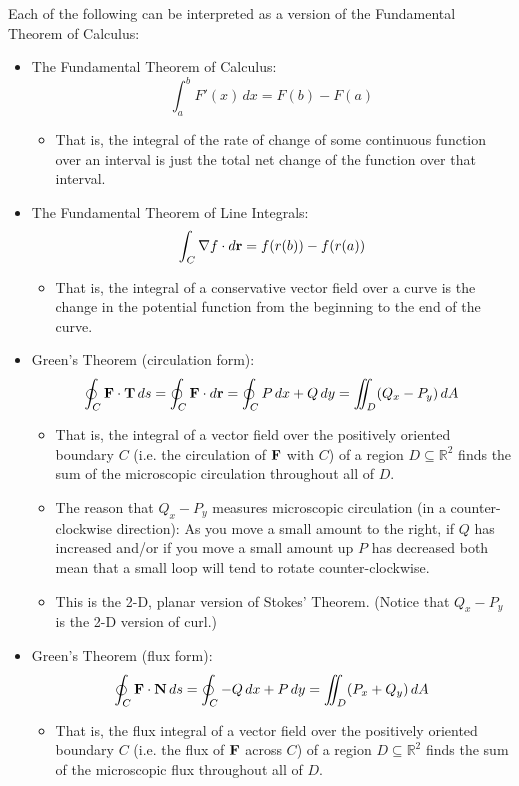Each of the following can be interpreted as a version of the Fundamental Theorem of Calculus:
\begin{itemize}
    \item The Fundamental Theorem of Calculus:
    \[
        \int_a^b F'(x) \, dx = F(b) - F(a)
    \]
    \begin{itemize}
        \item That is, the integral of the rate of change of some continuous function over an interval is just the total net change of the function over that interval.
    \end{itemize}
    \item The Fundamental Theorem of Line Integrals:
    \[
        \int_C \nabla f \cdot d\mathbf{r} = f(r(b)) - f(r(a))
    \]
    \begin{itemize}
        \item That is, the integral of a conservative vector field over a curve is the change in the potential function from the beginning to the end of the curve.
    \end{itemize}
    \item Green’s Theorem (circulation form): 
    \[
        \oint_C \mathbf{F} \cdot \mathbf{T} \, ds = \oint_C \mathbf{F} \cdot d\mathbf{r} = \oint_C P \, dx + Q \, dy = \iint_D (Q_x - P_y) \, dA
    \]
    \begin{itemize}
        \item That is, the integral of a vector field over the positively oriented boundary \(C\) (i.e. the circulation of \(\mathbf{F}\) with \(C\)) of a region \(D \subseteq \mathbb{R}^2\) finds the sum of the microscopic circulation throughout all of \(D\).
        \item The reason that \(Q_x - P_y\) measures microscopic circulation (in a counter-clockwise direction): As you move a small amount to the right, if \(Q\) has increased and/or if you move a small amount up \(P\) has decreased both mean that a small loop will tend to rotate counter-clockwise.
        \item This is the 2-D, planar version of Stokes’ Theorem. (Notice that \(Q_x - P_y\) is the 2-D version of curl.)
    \end{itemize}
    \item Green’s Theorem (flux form):
    \[
        \oint_C \mathbf{F} \cdot \mathbf{N} \, ds = \oint_C -Q \, dx + P \, dy = \iint_D (P_x + Q_y) \, dA
    \]
    \begin{itemize}
        \item That is, the flux integral of a vector field over the positively oriented boundary \(C\) (i.e. the flux of \(\mathbf{F}\) across \(C\)) of a region \(D \subseteq \mathbb{R}^2\) finds the sum of the microscopic flux throughout all of \(D\).

\end{itemize}
\end{itemize}

